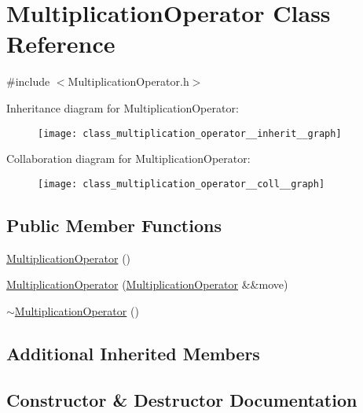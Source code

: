 \hypertarget{class_multiplication_operator}{}\section{Multiplication\+Operator Class Reference}
\label{class_multiplication_operator}


{\ttfamily \#include $<$Multiplication\+Operator.\+h$>$}



Inheritance diagram for Multiplication\+Operator\+:
\nopagebreak
\begin{figure}[H]
\begin{center}
\leavevmode
\texttt{[image: class\_multiplication\_operator\_\_inherit\_\_graph]}
\end{center}
\end{figure}


Collaboration diagram for Multiplication\+Operator\+:
\nopagebreak
\begin{figure}[H]
\begin{center}
\leavevmode
\texttt{[image: class\_multiplication\_operator\_\_coll\_\_graph]}
\end{center}
\end{figure}
\subsection*{Public Member Functions}
\begin{DoxyCompactItemize}
\item 
\mbox{\hyperlink{class_multiplication_operator_a2f5d8b158cf71cbd7a7c6d246d6ba284}{Multiplication\+Operator}} ()
\item 
\mbox{\hyperlink{class_multiplication_operator_a3a8b5ade5a878eb1bfa5445a05bacb86}{Multiplication\+Operator}} (\mbox{\hyperlink{class_multiplication_operator}{Multiplication\+Operator}} \&\&move)
\item 
\mbox{\hyperlink{class_multiplication_operator_a1aab7606a603780d2b03b96d8fd6fb4a}{$\sim$\+Multiplication\+Operator}} ()
\end{DoxyCompactItemize}
\subsection*{Additional Inherited Members}


\subsection{Constructor \& Destructor Documentation}
\mbox{\label{class_multiplication_operator_a2f5d8b158cf71cbd7a7c6d246d6ba284}} 

